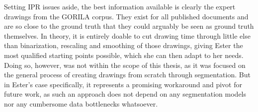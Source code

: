 Setting \acs{IPR} issues aside, the best information available is clearly the expert drawings from the \acs{GORILA} corpus.
They exist for all published documents and are so close to the ground truth that they could arguably be seen as ground truth themselves.
In theory, it is entirely doable to cut drawing time through little else than binarization, rescaling and smoothing of those drawings, giving Ester the most qualified starting points possible, which she can then adapt to her needs.
Doing so, however, was not within the scope of this thesis, as it was focused on the general process of creating drawings from scratch through segmentation.
But in Ester's case specifically, it represents a promising workaround and pivot for future work, as such an approach does not depend on any segmentation models nor any cumbersome data bottlenecks whatsoever.